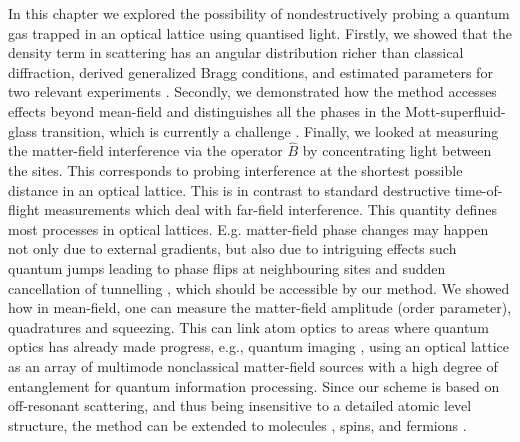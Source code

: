In this chapter we explored the possibility of nondestructively
probing a quantum gas trapped in an optical lattice using quantised
light. Firstly, we showed that the density term in scattering has an
angular distribution richer than classical diffraction, derived
generalized Bragg conditions, and estimated parameters for two
relevant experiments \cite{miyake2011, weitenberg2011}. Secondly, we
demonstrated how the method accesses effects beyond mean-field and
distinguishes all the phases in the Mott-superfluid-glass transition,
which is currently a challenge \cite{derrico2014}. Finally, we looked
at measuring the matter-field interference via the operator $\hat{B}$
by concentrating light between the sites. This corresponds to probing
interference at the shortest possible distance in an optical
lattice. This is in contrast to standard destructive time-of-flight
measurements which deal with far-field interference. This quantity
defines most processes in optical lattices. E.g. matter-field phase
changes may happen not only due to external gradients, but also due to
intriguing effects such quantum jumps leading to phase flips at
neighbouring sites and sudden cancellation of tunnelling
\cite{vukics2007}, which should be accessible by our method. We showed
how in mean-field, one can measure the matter-field amplitude (order
parameter), quadratures and squeezing. This can link atom optics to
areas where quantum optics has already made progress, e.g., quantum
imaging \cite{golubev2010, kolobov1999}, using an optical lattice as
an array of multimode nonclassical matter-field sources with a high
degree of entanglement for quantum information processing. Since our
scheme is based on off-resonant scattering, and thus being insensitive
to a detailed atomic level structure, the method can be extended to
molecules \cite{LP2013}, spins, and fermions \cite{ruostekoski2009}.

